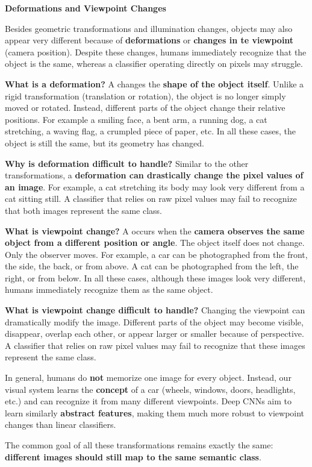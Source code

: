 \newpage

\begin{flushleft}
    \textcolor{Green3}{ \textbf{Deformations and Viewpoint Changes}}
\end{flushleft}
Besides geometric transformations and illumination changes, objects may also appear very different because of \textbf{deformations} or \textbf{changes in te viewpoint} (camera position). Despite these changes, humans immediately recognize that the object is the same, whereas a classifier operating directly on pixels may struggle.

\highspace
\textcolor{Green3}{ \textbf{What is a deformation?}} A  changes the \textbf{shape of the object itself}. Unlike a rigid transformation (translation or rotation), the object is no longer simply moved or rotated. Instead, different parts of the object change their relative positions. For example a smiling face, a bent arm, a running dog, a cat stretching, a waving flag, a crumpled piece of paper, etc. In all these cases, the object is still the same, but its geometry has changed.

\highspace
\textcolor{Red2}{ \textbf{Why is deformation difficult to handle?}} Similar to the other transformations, a \textbf{deformation can drastically change the pixel values of an image}. For example, a cat stretching its body may look very different from a cat sitting still. A classifier that relies on raw pixel values may fail to recognize that both images represent the same class.


\highspace
\textcolor{Green3}{ \textbf{What is viewpoint change?}} A  occurs when the \textbf{camera observes the same object from a different position or angle}. The object itself does not change. Only the observer moves. For example, a car can be photographed from the front, the side, the back, or from above. A cat can be photographed from the left, the right, or from below. In all these cases, although these images look very different, humans immediately recognize them as the same object.

\highspace
\textcolor{Red2}{ \textbf{What is viewpoint change difficult to handle?}} Changing the viewpoint can dramatically modify the image. Different parts of the object may become visible, disappear, overlap each other, or appear larger or smaller because of perspective. A classifier that relies on raw pixel values may fail to recognize that these images represent the same class.

\highspace
In general, humans do \textbf{not} memorize one image for every object. Instead, our visual system learns the \textbf{concept} of a car (wheels, windows, doors, headlights, etc.) and can recognize it from many different viewpoints. Deep CNNs aim to learn similarly \textbf{abstract features}, making them much more robust to viewpoint changes than linear classifiers.

\highspace
The common goal of all these transformations remains exactly the same: \textbf{different images should still map to the same semantic class}.
